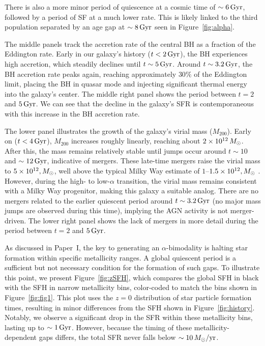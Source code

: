There is also a more minor period of quiescence at a cosmic time of $\sim6\,\textrm{Gyr}$, followed by a period of SF at a much lower rate. This is likely linked to the third population separated by an age gap at $\sim8\,\textrm{Gyr}$ seen in Figure~\ref{fig:alpha}.

The middle panels track the accretion rate of the central BH as a fraction of the Eddington rate. Early in our galaxy's history ($t<2\,\textrm{Gyr}$), the BH experiences high accretion, which steadily declines until $t\sim5\,\textrm{Gyr}$. Around $t\sim3.2\,\textrm{Gyr}$, the BH accretion rate peaks again, reaching approximately $30\%$ of the Eddington limit, placing the BH in quasar mode and injecting significant thermal energy into the galaxy's center. The middle right panel shows the period between $t=2$ and $5\,\textrm{Gyr}$. We can see that the decline in the galaxy's SFR is contemporaneous with this increase in the BH accretion rate.

The lower panel illustrates the growth of the galaxy's virial mass ($M_{200}$). Early on ($t<4\,\textrm{Gyr}$), $M_{200}$ increases roughly linearly, reaching about $2 \times 10^{12}\,M_{\odot}$. After this, the mass remains relatively stable until jumps occur around $t\sim10$ and $\sim12\,\textrm{Gyr}$, indicative of mergers. These late-time mergers raise the virial mass to $5 \times 10^{12},M_{\odot}$, well above the typical Milky Way estimate of $1$--$1.5\times 10^{12},M_{\odot}$ \citep[e.g.][]{2016ARA&A..54..529B}. However, during the high- to low-$\alpha$ transition, the virial mass remains consistent with a Milky Way progenitor, making this galaxy a suitable analog. There are no mergers related to the earlier quiescent period around $t\sim3.2\,\textrm{Gyr}$ (no major mass jumps are observed during this time), implying the AGN activity is not merger-driven. The lower right panel shows the lack of mergers in more detail during the period between $t=2$ and $5\,\textrm{Gyr}$.

As discussed in Paper~I, the key to generating an $\alpha$-bimodality is halting star formation within specific metallicity ranges. A global quiescent period is a sufficient but not necessary condition for the formation of such gaps. To illustrate this point, we present Figure~\ref{fig:zSFH}, which compares the global SFH in black with the SFH in narrow metallicity bins, color-coded to match the bins shown in Figure~\ref{fig:fig1}. This plot uses the $z=0$ distribution of star particle formation times, resulting in minor differences from the SFH shown in Figure~\ref{fig:history}. Notably, we observe a significant drop in the SFR within these metallicity bins, lasting up to $\sim1\,\textrm{Gyr}$. However, because the timing of these metallicity-dependent gaps differs, the total SFR never falls below $\sim10\,M_{\odot}/\textrm{yr}$.

